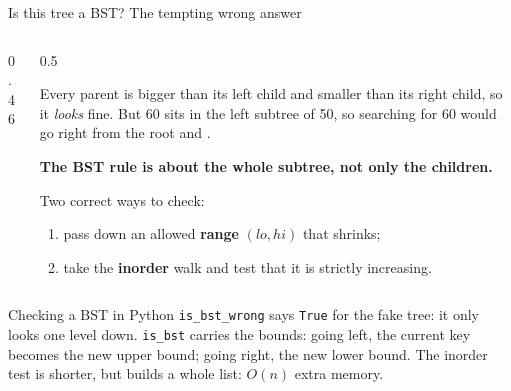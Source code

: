 \documentclass[aspectratio=169,10pt]{beamer}
\begin{document}
\begin{frame}{Is this tree a BST? The tempting wrong answer}
\begin{columns}[T]
\begin{column}{0.46\textwidth}
\begin{sfig}[0.6]
\end{sfig}
\end{column}
\begin{column}{0.5\textwidth}
{\small
Every parent is bigger than its left child and smaller than its right child, so it \emph{looks} fine. But 60 sits in the left subtree of 50, so searching for 60 would go right from the root and .

\vspace{2mm}
\textbf{The BST rule is about the whole subtree, not only the children.}

\vspace{2mm}
Two correct ways to check:
\begin{enumerate}\setlength\itemsep{2pt}
\item pass down an allowed \textbf{range} $(lo, hi)$ that shrinks;
\item take the \textbf{inorder} walk and test that it is strictly increasing.\end{enumerate}}
\end{column}
\end{columns}
\end{frame}

\begin{frame}[allowframebreaks]{Checking a BST in Python}
\framebreak
{}
\framebreak
{}
\vspace{2mm}
\vspace{2mm}
{\small
\texttt{is\_bst\_wrong} says \texttt{True} for the fake tree: it only looks one level down. \texttt{is\_bst} carries the bounds: going left, the current key becomes the new upper bound; going right, the new lower bound. The inorder test is shorter, but builds a whole list: $O(n)$ extra memory.}
\end{frame}
\end{document}

